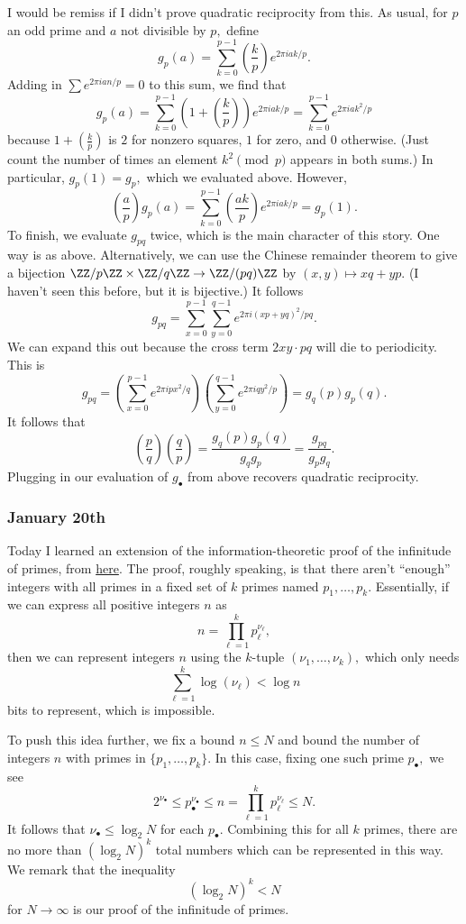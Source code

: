 I would be remiss if I didn't prove quadratic reciprocity from this. As usual, for $p$ an odd prime and $a$ not divisible by $p,$ define
\[g_p(a)=\sum_{k=0}^{p-1}\left(\frac kp\right)e^{2\pi iak/p}.\]
Adding in $\sum e^{2\pi ian/p}=0$ to this sum, we find that
\[g_p(a)=\sum_{k=0}^{p-1}\left(1+\left(\frac kp\right)\right)e^{2\pi iak/p}=\sum_{k=0}^{p-1}e^{2\pi iak^2/p}\]
because $1+\left(\frac kp\right)$ is $2$ for nonzero squares, $1$ for zero, and $0$ otherwise. (Just count the number of times an element $k^2\pmod p$ appears in both sums.) In particular, $g_p(1)=g_p,$ which we evaluated above. However,
\[\left(\frac ap\right)g_p(a)=\sum_{k=0}^{p-1}\left(\frac{ak}p\right)e^{2\pi iak/p}=g_p(1).\]
To finish, we evaluate $g_{pq}$ twice, which is the main character of this story. One way is as above. Alternatively, we can use the Chinese remainder theorem to give a bijection $\ZZ/p\ZZ\times\ZZ/q\ZZ\to\ZZ/(pq)\ZZ$ by $(x,y)\mapsto xq+yp.$ (I haven't seen this before, but it is bijective.) It follows
\[g_{pq}=\sum_{x=0}^{p-1}\sum_{y=0}^{q-1}e^{2\pi i(xp+yq)^2/pq}.\]
We can expand this out because the cross term $2xy\cdot pq$ will die to periodicity. This is
\[g_{pq}=\left(\sum_{x=0}^{p-1}e^{2\pi ipx^2/q}\right)\left(\sum_{y=0}^{q-1}e^{2\pi iqy^2/p}\right)=g_q(p)g_p(q).\]
It follows that
\[\left(\frac pq\right)\left(\frac qp\right)=\frac{g_q(p)g_p(q)}{g_qg_p}=\frac{g_{pq}}{g_pg_q}.\]
Plugging in our evaluation of $g_\bullet$ from above recovers quadratic reciprocity.

\subsubsection{January 20th}
Today I learned an extension of the information-theoretic proof of the infinitude of primes, from \href{https://qchu.wordpress.com/2009/09/02/some-remarks-on-the-infinitude-of-primes/}{here}. The proof, roughly speaking, is that there aren't ``enough'' integers with all primes in a fixed set of $k$ primes named $p_1,\ldots,p_k.$ Essentially, if we can express all positive integers $n$ as
\[n=\prod_{\ell=1}^kp_\ell^{\nu_\ell},\]
then we can represent integers $n$ using the $k$-tuple $(\nu_1,\ldots,\nu_k),$ which only needs
\[\sum_{\ell=1}^k\log(\nu_\ell)<\log n\]
bits to represent, which is impossible.

To push this idea further, we fix a bound $n\le N$ and bound the number of integers $n$ with primes in $\{p_1,\ldots,p_k\}.$ In this case, fixing one such prime $p_\bullet,$ we see
\[2^{\nu_\bullet}\le p_\bullet^{\nu_\bullet}\le n=\prod_{\ell=1}^kp_\ell^{\nu_\ell}\le N.\]
It follows that $\nu_\bullet\le\log_2N$ for each $p_\bullet.$ Combining this for all $k$ primes, there are no more than $(\log_2N)^k$ total numbers which can be represented in this way. We remark that the inequality
\[(\log_2N)^k<N\]
for $N\to\infty$ is our proof of the infinitude of primes.

